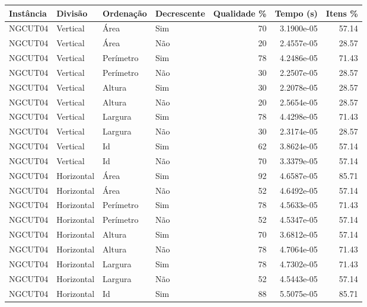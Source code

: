 \begin{tabular}{llllrrr}
\hline
Instância & Divisão     & Ordenação & Decrescente & Qualidade \% & Tempo (s)  & Itens \% \\
\hline
NGCUT04   & Vertical    & Área      & Sim         & 70           & 3.1900e-05 & 57.14    \\
NGCUT04   & Vertical    & Área      & Não         & 20           & 2.4557e-05 & 28.57    \\
NGCUT04   & Vertical    & Perímetro & Sim         & 78           & 4.2486e-05 & 71.43    \\
NGCUT04   & Vertical    & Perímetro & Não         & 30           & 2.2507e-05 & 28.57    \\
NGCUT04   & Vertical    & Altura    & Sim         & 30           & 2.2078e-05 & 28.57    \\
NGCUT04   & Vertical    & Altura    & Não         & 20           & 2.5654e-05 & 28.57    \\
NGCUT04   & Vertical    & Largura   & Sim         & 78           & 4.4298e-05 & 71.43    \\
NGCUT04   & Vertical    & Largura   & Não         & 30           & 2.3174e-05 & 28.57    \\
NGCUT04   & Vertical    & Id        & Sim         & 62           & 3.8624e-05 & 57.14    \\
NGCUT04   & Vertical    & Id        & Não         & 70           & 3.3379e-05 & 57.14    \\
NGCUT04   & Horizontal  & Área      & Sim         & 92           & 4.6587e-05 & 85.71    \\
NGCUT04   & Horizontal  & Área      & Não         & 52           & 4.6492e-05 & 57.14    \\
NGCUT04   & Horizontal  & Perímetro & Sim         & 78           & 4.5633e-05 & 71.43    \\
NGCUT04   & Horizontal  & Perímetro & Não         & 52           & 4.5347e-05 & 57.14    \\
NGCUT04   & Horizontal  & Altura    & Sim         & 70           & 3.6812e-05 & 57.14    \\
NGCUT04   & Horizontal  & Altura    & Não         & 78           & 4.7064e-05 & 71.43    \\
NGCUT04   & Horizontal  & Largura   & Sim         & 78           & 4.7302e-05 & 71.43    \\
NGCUT04   & Horizontal  & Largura   & Não         & 52           & 4.5443e-05 & 57.14    \\
NGCUT04   & Horizontal  & Id        & Sim         & 88           & 5.5075e-05 & 85.71    \\

\end{tabular}

